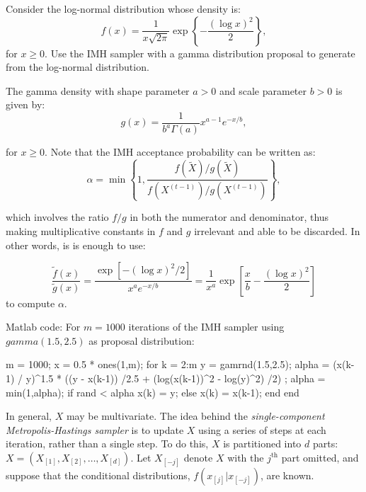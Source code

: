 \begin{example}
Consider the log-normal distribution whose density is:
\begin{equation}
f(x)=\frac{1}{x\sqrt{2\pi}}\exp\left\{-\frac{(\log x)^2}{2} \right\},
\end{equation}
for $x\geq 0$. Use the IMH sampler with a gamma distribution proposal to generate from the log-normal distribution.

The gamma density with shape parameter $a > 0$ and scale parameter $b > 0$ is given by:
\begin{equation}
g(x)=\frac{1}{b^a\Gamma(a)}x^{a-1}e^{-x/b},
\end{equation}


for $x \geq  0$. Note that the IMH acceptance probability can be written as:
$$\alpha=\min\left\{1, \frac{f(\tilde{X})/g(\tilde{X})}{f(X^{(t-1)})/g(X^{(t-1)})}\right\},$$

which involves the ratio $f /g$ in both the numerator and denominator, thus making multiplicative constants in $f$ and $g$ irrelevant and able to be discarded. In other words, is is enough to use:

$$\frac{\tilde{f}(x)}{\tilde{g}(x)}=\frac{\exp[-(\log x)^2/2]}{x^ae^{-x/b}}=\frac{1}{x^a}\exp[\frac{x}{b}-\frac{(\log x)^2}{2}]
$$
to compute $\alpha$.

Matlab code: For $m = 1000$ iterations of the IMH sampler using $gamma(1.5, 2.5)$ as proposal distribution:
\begin{VrbM}
m = 1000;
x = 0.5 * ones(1,m); %
for k = 2:m
	y = gamrnd(1.5,2.5); %
  	alpha = (x(k-1) / y)^1.5 * \exp((y - x(k-1)) /2.5 + (log(x(k-1))^2 - log(y)^2) /2) ;
  	alpha = min(1,alpha);
  	if rand < alpha
		x(k) = y;
	else
		x(k) = x(k-1);
	end %
end %
\end{VrbM}
\end{example}

In general, $X$ may be multivariate. The idea behind the {\it single-component Metropolis-Hastings sampler} is to update $X$ using a series of steps at each iteration, rather than a single step. To do this, $X$ is partitioned into $d$ parts: $X=(X_[1],X_[2],\ldots,X_[d])$. Let $X_[-j]$ denote $X$ with the $j^{\textrm{th}}$ part omitted, and suppose that the conditional distributions, $f(x_{[j]}|x_{[-j]})$, are known.

